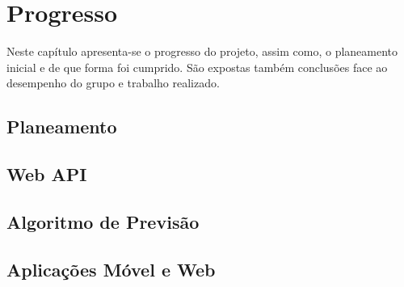 %
%
\chapter{Progresso} \label{cap4}

Neste capítulo apresenta-se o progresso do projeto, assim como, o planeamento inicial e de que forma foi cumprido. São  expostas também conclusões face ao desempenho do grupo e trabalho realizado.

\section{Planeamento}\label{sec41}

\section{Web API}\label{sec42}

\section{Algoritmo de Previsão}\label{sec43}

\section{Aplicações Móvel e Web}\label{sec44}









